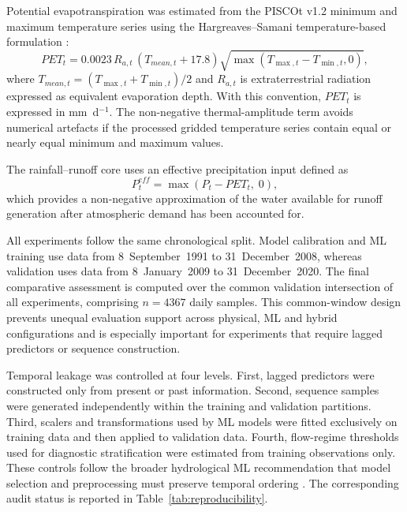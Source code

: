 \documentclass[a4paper,fleqn]{cas-sc}
\begin{document}
Potential evapotranspiration was estimated from the PISCOt v1.2
minimum and maximum temperature series using the Hargreaves--Samani
temperature-based formulation \citep{hargreaves1985reference}:
\begin{equation}
PET_t = 0.0023\,R_{a,t}\,(T_{mean,t}+17.8)
        \sqrt{\max(T_{\max,t}-T_{\min,t},0)},
\label{eq:hargreaves-samani}
\end{equation}
where $T_{mean,t}=(T_{\max,t}+T_{\min,t})/2$ and $R_{a,t}$ is
extraterrestrial radiation expressed as equivalent evaporation depth.
With this convention, $PET_t$ is expressed in mm~d$^{-1}$. The
non-negative thermal-amplitude term avoids numerical artefacts if the
processed gridded temperature series contain equal or nearly equal
minimum and maximum values.

The rainfall--runoff core uses an effective precipitation input defined
as
\begin{equation}
P^{eff}_t = \max(P_t - PET_t,\;0),
\label{eq:peff}
\end{equation}
which provides a non-negative approximation of the water available for
runoff generation after atmospheric demand has been accounted for.

All experiments follow the same chronological split. Model calibration
and ML training use data from 8~September~1991 to 31~December~2008,
whereas validation uses data from 8~January~2009 to 31~December~2020.
The final comparative assessment is computed over the common validation
intersection of all experiments, comprising $n=4367$ daily samples. This
common-window design prevents unequal evaluation support across
physical, ML and hybrid configurations and is especially important for
experiments that require lagged predictors or sequence construction.

Temporal leakage was controlled at four levels. First, lagged predictors
were constructed only from present or past information. Second,
sequence samples were generated independently within the training and
validation partitions. Third, scalers and transformations used by ML
models were fitted exclusively on training data and then applied to
validation data. Fourth, flow-regime thresholds used for diagnostic
stratification were estimated from training observations only. These
controls follow the broader hydrological ML recommendation that model
selection and preprocessing must preserve temporal ordering
\citep{arsenault2022continuous,chen2013finding}. The corresponding
audit status is reported in Table~\ref{tab:reproducibility}.
\end{document}
